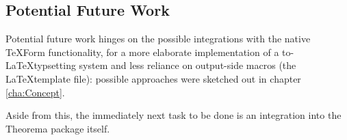 \subsection{Potential Future Work}

Potential future work hinges on the possible integrations with the native TeXForm functionality, for a more elaborate implementation of a to-\LaTeX typsetting system and less reliance on output-side macros (the \LaTeX template file): possible approaches were sketched out in chapter \ref{cha:Concept}.

Aside from this, the immediately next task to be done is an integration into the Theorema package itself.